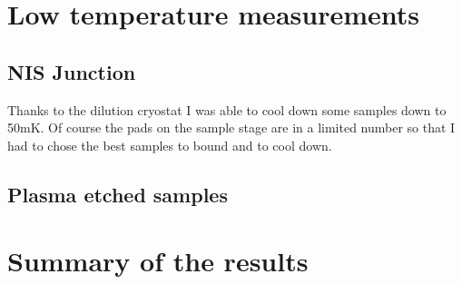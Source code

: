                 \section{Low temperature measurements}
                
                \subsection{NIS Junction}
                
                Thanks to the dilution cryostat I was able to cool down some samples down to 50mK. Of course the pads on the sample stage are in a limited number so that I had to chose the best samples to bound and to cool down. 
                
                
                
                
                \subsection{Plasma etched samples}
                
                
                
                \section{Summary of the results}
                
                
                
